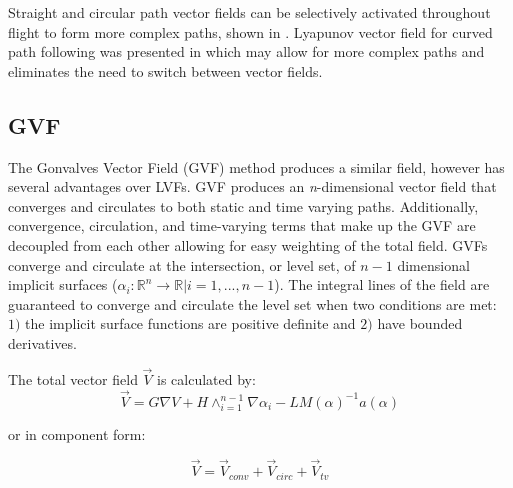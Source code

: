 \documentclass[conf]{new-aiaa}
\begin{document}
Straight and circular path vector fields can be selectively activated throughout flight to form more complex paths, shown in \cite{nelson_cooperative_2005,nelson_vector_2006,nelson_vector_2007,jung_unmanned_2016}. Lyapunov vector field for curved path following was presented in \cite{griffiths_vector_2006} which may allow for more complex paths and eliminates the need to switch between vector fields. \\

\subsection{GVF}
The Gonvalves Vector Field (GVF) method produces a similar field, however has several advantages over LVFs. GVF produces an \textit{n}-dimensional vector field that converges and circulates to both static and time varying paths. Additionally, convergence, circulation, and time-varying terms that make up the GVF are decoupled from each other allowing for easy weighting of the total field. GVFs converge and circulate at the intersection, or level set, of $n-1$ dimensional implicit surfaces ($\alpha_i:\mathbb{R}^n\rightarrow\mathbb{R} | i=1,...,n-1$). The integral lines of the field are guaranteed to converge and circulate the level set when two conditions are met: $1)$ the implicit surface functions are positive definite and $2)$ have bounded derivatives. %




The total vector field $\overrightarrow{V}$ is calculated by:
\begin{equation}\label{eq:GVF}
\overrightarrow{V} = G \nabla V + H \wedge_{i=1}^{n-1}\nabla\alpha_i  - LM(\alpha)^{-1} a(\alpha)
\end{equation}

or in component form:

\begin{equation}\label{simpleGVF}
\overrightarrow{V} = \overrightarrow{V}_{conv} + \overrightarrow{V}_{circ} + \overrightarrow{V}_{tv} 
\end{equation}	
\end{document}
